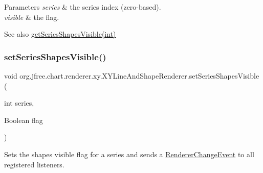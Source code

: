 \begin{DoxyParams}{Parameters}
{\em series} & the series index (zero-\/based). \\
\hline
{\em visible} & the flag.\\
\hline
\end{DoxyParams}
\begin{DoxySeeAlso}{See also}
\mbox{\hyperlink{classorg_1_1jfree_1_1chart_1_1renderer_1_1xy_1_1_x_y_line_and_shape_renderer_a3021273363552d317fa7cf150a012141}{get\+Series\+Shapes\+Visible(int)}} 
\end{DoxySeeAlso}
\mbox{\label{classorg_1_1jfree_1_1chart_1_1renderer_1_1xy_1_1_x_y_line_and_shape_renderer_a52a7cf419f31dc7824110cf4ed4f1597}} 
\subsubsection{\texorpdfstring{set\+Series\+Shapes\+Visible()}{setSeriesShapesVisible()}\hspace{0.1cm}{\footnotesize\ttfamily [2/2]}}
{\footnotesize\ttfamily void org.\+jfree.\+chart.\+renderer.\+xy.\+X\+Y\+Line\+And\+Shape\+Renderer.\+set\+Series\+Shapes\+Visible (\begin{DoxyParamCaption}\item[{int}]{series,  }\item[{Boolean}]{flag }\end{DoxyParamCaption})}

Sets the \textquotesingle{}shapes visible\textquotesingle{} flag for a series and sends a \mbox{\hyperlink{}{Renderer\+Change\+Event}} to all registered listeners.


